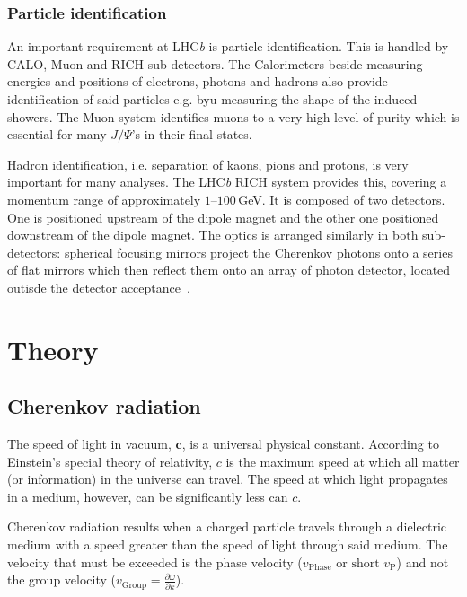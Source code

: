 \documentclass[11pt,twoside]{scrreprt}
\begin{document}
\subsection{Particle identification} %
\label{sub:particle_identification}
An important requirement at LHC\textit{b} is particle identification. This is handled by CALO, Muon and RICH sub-detectors. The Calorimeters beside measuring energies and positions of electrons, photons and hadrons also provide identification of said particles e.g. byu measuring the shape of the induced showers. The Muon system identifies muons to a very high level of purity which is essential for many \(J/\Psi\)'s in their final states.

Hadron identification, i.e. separation of kaons, pions and protons, is very important for many analyses. The LHC\textit{b} RICH system provides this, covering a momentum range of approximately $1$--$100$\,GeV. It is composed of two detectors. One is positioned upstream of the dipole magnet and the other one positioned downstream of the dipole magnet. The optics is arranged similarly in both sub-detectors: spherical focusing mirrors project the Cherenkov photons onto a series of flat mirrors which then reflect them onto an array of photon detector, located outisde the detector acceptance~\cite{Powell:2011}.



\chapter{Theory}

\section{Cherenkov radiation} %
\label{sec:cherenkov_radiation}

The speed of light in vacuum, \( \mathbf{c} \), is a universal physical constant. According to Einstein's special theory of relativity, \( c \) is the maximum speed at which all matter (or information) in the universe can travel. The speed at which light propagates in a medium, however, can be significantly less can \( c \).

Cherenkov radiation results when a charged particle travels through a dielectric medium with a speed greater than the speed of light through said medium. The velocity that must be exceeded is the phase velocity (\( v_{\text{Phase}} \text{ or short } v_{\text{P}} \)) and not the group velocity (\( v_{\text{Group}} = \frac{\partial \omega}{\partial k} \)).
\end{document}
